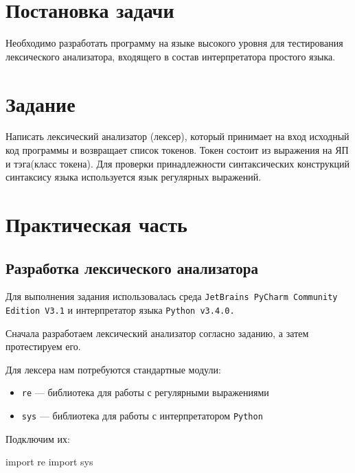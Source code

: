 \documentclass[a4paper,12pt]{article}
\begin{document}
\newpage

\section{Постановка задачи}
\par Необходимо разработать программу на языке высокого уровня для тестирования лексического анализатора, входящего в состав интерпретатора простого языка.
\section{Задание}
\par Написать лексический анализатор (лексер), который принимает на вход исходный код программы и возвращает список токенов. Токен состоит из выражения на ЯП и тэга(класс токена). Для проверки принадлежности синтаксических конструкций синтаксису языка используется язык регулярных выражений.
\section{Практическая часть}

\subsection{Разработка лексического анализатора}
\par Для выполнения задания использовалась среда \verb|JetBrains PyCharm Community| \\ \verb|Edition V3.1| и интерпретатор языка \verb|Python v3.4.0.|\\

\par Сначала разработаем лексический анализатор согласно заданию, а затем протестируем его.

Для лексера нам потребуются стандартные модули:
\begin{itemize}
\item \verb|re| --- библиотека для работы с регулярными выражениями
\item \verb|sys| --- библиотека для работы с интерпретатором \verb|Python|\\
\end{itemize} 

Подключим их:
\begin{python}
import re
import sys\\
\end{python}
\vspace{12pt}
\end{document}
